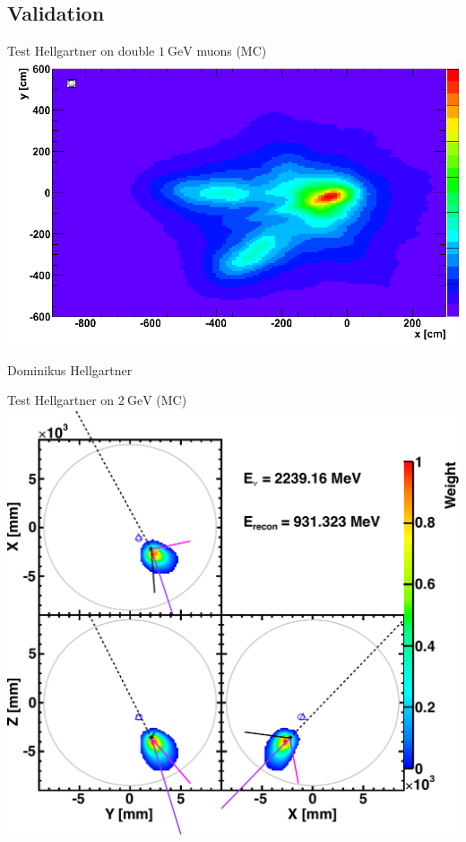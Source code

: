 \documentclass[14pt]{beamer}
\begin{document}
\subsection{Validation}
\begin{frame}{\normalsize Test Hellgartner on double
	$\SI{1}{\giga\electronvolt}$ muons (MC)}
	\includegraphics[width=\linewidth]{hellgartner_double_muon.pdf}

	{\footnotesize Dominikus Hellgartner}
\end{frame}

\begin{frame}{Test Hellgartner on
	$\SI{2}{\giga\electronvolt}$ \Pnue (MC)}
	\centering
	\includegraphics[width=0.75\linewidth]{hellgartner_reconstruction_2gev_nue_klg4sim.pdf}
\end{frame}
\end{document}

